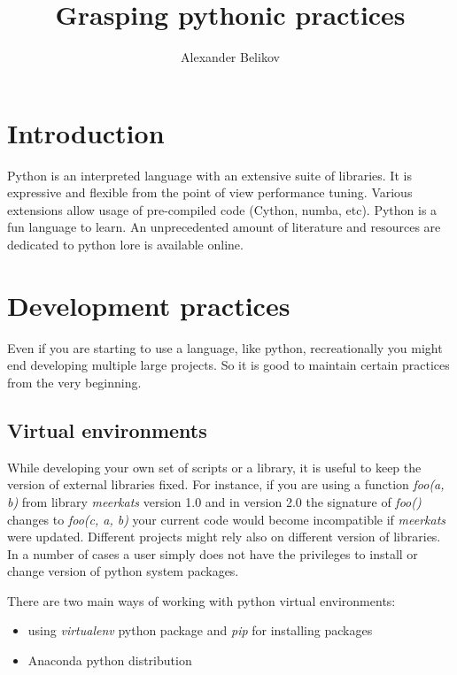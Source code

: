 \documentclass[article]{revtex4}
\begin{document}

\title{Grasping pythonic practices}
\author{Alexander Belikov}

\maketitle


\section{Introduction}
Python is an interpreted language with an extensive suite of libraries. It is expressive and flexible from the point of view performance tuning. Various extensions allow usage of pre-compiled code (Cython, numba, etc).
Python is a fun language to learn. An unprecedented amount of literature and resources are dedicated to python lore is available online.

\section{Development practices}
Even if you are starting to use a language, like python, recreationally you might end developing multiple large projects. So it is good to maintain certain practices from the very beginning.


\subsection{Virtual environments}
While developing your own set of scripts or a library, it is useful to keep the version of external libraries fixed.
For instance, if you are using a function {\it foo(a, b)} from library {\it meerkats} version 1.0 and in version 2.0 the signature of {\it foo()} changes to {\it foo(c, a, b)} your current code would become incompatible if {\it meerkats} were updated.
Different projects might rely also on different version of libraries.
In a number of cases a user simply does not have the privileges to install or change version of python system packages.

There are two main ways of working with python virtual environments:
\begin{itemize}
    \item using {\it virtualenv} python package and {\it pip} for installing packages
    \item Anaconda python distribution
\end{itemize}
\end{document}
